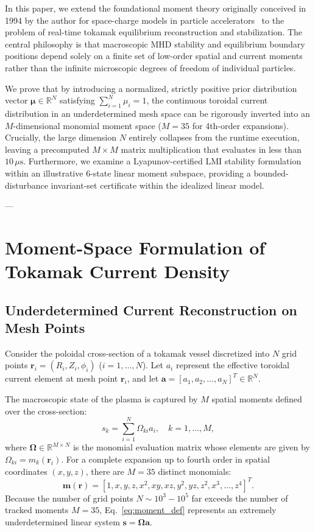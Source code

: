 \documentclass[11pt,a4paper]{article}
\begin{document}
In this paper, we extend the foundational moment theory originally conceived in 1994 by the author for space-charge models in particle accelerators~\cite{ahn1994preliminary} to the problem of real-time tokamak equilibrium reconstruction and stabilization. The central philosophy is that macroscopic MHD stability and equilibrium boundary positions depend solely on a finite set of low-order spatial and current moments rather than the infinite microscopic degrees of freedom of individual particles. 

We prove that by introducing a normalized, strictly positive prior distribution vector $\bm{\mu} \in \mathbb{R}^N$ satisfying $\sum_{i=1}^N \mu_i = 1$, the continuous toroidal current distribution in an underdetermined mesh space can be rigorously inverted into an $M$-dimensional monomial moment space ($M=35$ for 4th-order expansions). Crucially, the large dimension $N$ entirely collapses from the runtime execution, leaving a precomputed $M \times M$ matrix multiplication that evaluates in less than $10\,\mu\mathrm{s}$. Furthermore, we examine a Lyapunov-certified LMI stability formulation within an illustrative 6-state linear moment subspace, providing a bounded-disturbance invariant-set certificate within the idealized linear model.

---

\section{Moment-Space Formulation of Tokamak Current Density}

\subsection{Underdetermined Current Reconstruction on Mesh Points}
Consider the poloidal cross-section of a tokamak vessel discretized into $N$ grid points $\bm{r}_i = (R_i, Z_i, \phi_i)$ ($i = 1, \dots, N$). Let $a_i$ represent the effective toroidal current element at mesh point $\bm{r}_i$, and let $\bm{a} = [a_1, a_2, \dots, a_N]^T \in \mathbb{R}^N$. 

The macroscopic state of the plasma is captured by $M$ spatial moments defined over the cross-section:
\begin{equation}
    s_k = \sum_{i=1}^N \Omega_{ki} a_i, \quad k = 1, \dots, M,
    \label{eq:moment_def}
\end{equation}
where $\bm{\Omega} \in \mathbb{R}^{M \times N}$ is the monomial evaluation matrix whose elements are given by $\Omega_{ki} = m_k(\bm{r}_i)$. For a complete expansion up to fourth order in spatial coordinates $(x,y,z)$, there are $M = 35$ distinct monomials:
\begin{equation}
    \bm{m}(\bm{r}) = \left[ 1, x, y, z, x^2, xy, xz, y^2, yz, z^2, x^3, \dots, z^4 \right]^T.
\end{equation}
Because the number of grid points $N \sim 10^3 - 10^5$ far exceeds the number of tracked moments $M = 35$, Eq.~\eqref{eq:moment_def} represents an extremely underdetermined linear system $\bm{s} = \bm{\Omega} \bm{a}$. 
\end{document}
